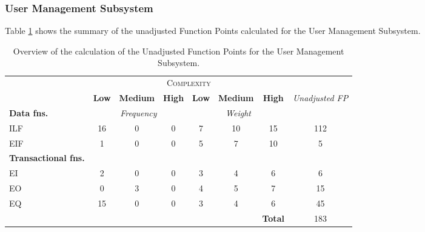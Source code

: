 \subsubsection{User Management Subsystem}
Table \ref{tbl_UMS_UFP} shows the summary of the unadjusted Function Points calculated for the User Management Subsystem.
\begin{table}[hbtp]
\centering
\begin{tabular}{|l|c|c|c|c|c|c|c|}
\cline{2-7}
\multicolumn{1}{c}{} & \multicolumn{6}{|c|}{\textsc{Complexity}} & \multicolumn{1}{c}{}  \\ \cline{2-8}
\multicolumn{1}{c|}{} & \textbf{Low} & \textbf{Medium} & \textbf{High} & \textbf{Low} & \textbf{Medium} & \textbf{High} & \multirow{2}{*}{\textit{Unadjusted FP}} \\ \cline{1-7}
\textbf{Data fns.} & \multicolumn{3}{|c|}{\textit{Frequency}} &  \multicolumn{3}{|c|}{\textit{Weight}} & \\ \hline
ILF 	& 16 & 0 & 0 & 7 & 10 & 15 & 112 	\\ \hline
EIF 	& 1  & 0 & 0 & 5 & 7  & 10 & 5		\\ \hline
\textbf{Transactional fns.} & \multicolumn{7}{|c|}{} \\ \hline
EI 		& 2  & 0 & 0 & 3 & 4  & 6  & 6 		\\ \hline
EO 		& 0  & 3 & 0 & 4 & 5  & 7  & 15		\\ \hline
EQ		& 15 & 0 & 0 & 3 & 4  & 6  & 45		\\ \hline
\multicolumn{6}{c|}{} & \textbf{Total} & 183 \\ \cline{7-8}
\end{tabular}
\caption{Overview of the calculation of the Unadjusted Function Points for the User Management Subsystem.}
\label{tbl_UMS_UFP}
\end{table}

